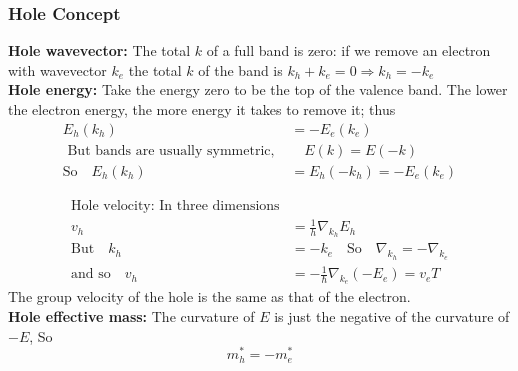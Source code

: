 \subsubsection{Hole Concept}
\textbf{Hole wavevector:} The total $k$ of a full band is zero: if we remove an electron with wavevector $k_{e}$ the total $k$ of the band is $k_{h}+k_{e}=0 \Rightarrow k_{h}=-k_{e}$\\
\textbf{Hole energy:} Take the energy zero to be the top of the valence band. The lower the electron energy, the more energy it takes to remove it; thus
\begin{align*}
E_{h}\left(k_{h}\right)&=-E_{e}\left(k_{e}\right)\\
\text { But bands are usually symmetric, }& \quad E(k)=E(-k)\\
\text{So}\quad E_{h}\left(k_{h}\right)&=E_{h}\left(-k_{h}\right)=-E_{e}\left(k_{e}\right)
\end{align*}

\begin{align*}
\text{Hole velocity: In three dimensions}\\
v_{h}&=\frac{1}{h} \nabla_{k_{h}} E_{h}\\
\text{But}\quad k_{h}&=-k_{e} \quad\text{So}\quad \nabla_{k_{h}}=-\nabla_{k_{e}}\\
\text{and so}\quad v_{h}&=-\frac{1}{\hbar} \nabla_{k_{e}}\left(-E_{e}\right)=v_{e}
T\end{align*}
The group velocity of the hole is the same as that of the electron.\\
\textbf{Hole effective mass:} The curvature of $E$ is just the negative of the curvature of $-E$,
So
$$
m_{h}^{*}=-m_{e}^{*}
$$
